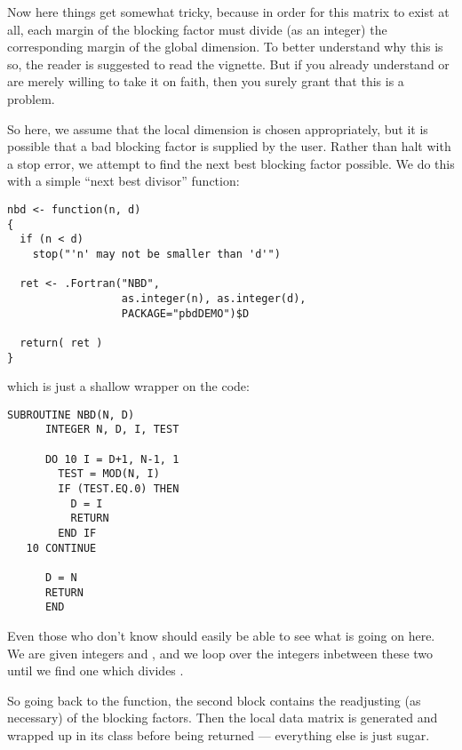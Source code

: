 Now here things get somewhat tricky, because in order for this matrix to exist at all, each margin of the blocking factor must divide (as an integer) the corresponding margin of the global dimension.  To better understand why this is so, the reader is suggested to read the  vignette.  But if you already understand or are merely willing to take it on faith, then you surely grant that this is a problem.

So here, we assume that the local dimension is chosen appropriately, but it is possible that a bad blocking factor is supplied by the user.  Rather than halt with a stop error, we attempt to find the next best blocking factor possible.  We do this with a simple ``next best divisor'' function:

\begin{lstlisting}[language=rr,title=nbd()]
nbd <- function(n, d)
{
  if (n < d)
    stop("'n' may not be smaller than 'd'")
  
  ret <- .Fortran("NBD", 
                  as.integer(n), as.integer(d),
                  PACKAGE="pbdDEMO")$D
  
  return( ret )
}
\end{lstlisting}

which is just a shallow wrapper on the  code:

\begin{lstlisting}[language=ft,title=NBD]
      SUBROUTINE NBD(N, D)
      INTEGER N, D, I, TEST
      
      DO 10 I = D+1, N-1, 1
        TEST = MOD(N, I)
        IF (TEST.EQ.0) THEN
          D = I
          RETURN
        END IF
   10 CONTINUE
      
      D = N
      RETURN
      END
\end{lstlisting}

Even those who don't know  should easily be able to see what is going on here.  We are given integers  and , and we loop over the integers inbetween these two until we find one which divides .

So going back to the  function, the second  block contains the readjusting (as necessary) of the blocking factors.  Then the local data matrix is generated and wrapped up in its class before being returned --- everything else is just sugar.